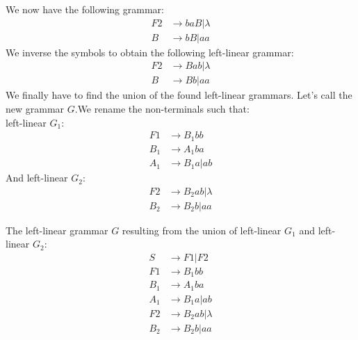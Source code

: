 \noindent We now have the following grammar:
\begin{align*}
    F2 &\rightarrow baB | \lambda\\
    B &\rightarrow bB | aa
\end{align*}
\noindent We inverse the symbols to obtain the following left-linear grammar:
\begin{align*}
    F2 &\rightarrow Bab | \lambda\\
    B &\rightarrow Bb | aa
\end{align*}
\noindent We finally have to find the union of the found left-linear grammars. Let's call the new grammar $G$.We rename the non-terminals such that:\\
left-linear $G_1$:
\begin{align*}
    F1 &\rightarrow B_1bb\\
    B_1 &\rightarrow A_1ba\\
    A_1 &\rightarrow B_1a | ab
\end{align*}
\noindent And left-linear $G_2$:
\begin{align*}
    F2 &\rightarrow B_2ab | \lambda\\
    B_2 &\rightarrow B_2b | aa
\end{align*}

\noindent The left-linear grammar $G$ resulting from the union of left-linear $G_1$ and left-linear $G_2$:
\begin{align*}
    S &\rightarrow F1|F2\\
    F1 &\rightarrow B_1bb\\
    B_1 &\rightarrow A_1ba\\
    A_1 &\rightarrow B_1a | ab\\
    F2 &\rightarrow B_2ab | \lambda\\
    B_2 &\rightarrow B_2b | aa
\end{align*}




